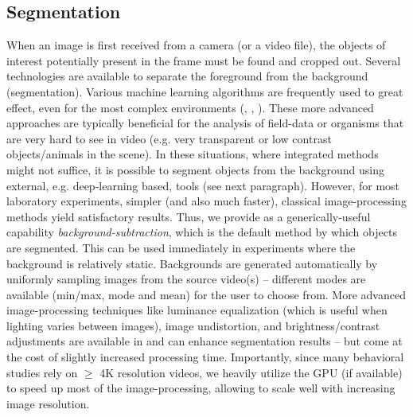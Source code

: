\documentclass[9pt,lineno]{elife}
\newcommand{\TRex}{\protect\path{TRex}}
\newcommand{\TGrabs}{\protect\path{TGrabs}}
\begin{document}
\subsection{Segmentation}

When an image is first received from a camera (or a video file), the objects of interest potentially present in the frame must be {\color{blue}found} and cropped out. Several technologies are available to separate the foreground from the background (segmentation). Various machine learning algorithms are frequently used to great effect, even for the most complex environments (\citealt{hughey2018challenges}, \citealt{robie2017machine}, \citealt{francisco2019low}). These more advanced approaches are typically beneficial for the analysis of field-data or organisms that are very hard to see in video (e.g. very transparent or low contrast objects/animals in the scene). {\color{blue} In these situations, where integrated methods might not suffice, it is possible to segment objects from the background using external, e.g. deep-learning based, tools (see next paragraph).} However, for most laboratory experiments, simpler (and also much faster), classical image-processing methods yield satisfactory results. {\color{blue} Thus, we provide as a generically-useful capability \emph{background-subtraction}, which is the default method by which objects are segmented. This can be used immediately in experiments where the background is relatively static. Backgrounds are generated automatically by uniformly sampling images from the source video(s) -- different modes are available (min/max, mode and mean) for the user to choose from. More advanced image-processing techniques like luminance equalization (which is useful when lighting varies between images), image undistortion, and brightness/contrast adjustments are available in \TGrabs{} and can enhance segmentation results -- but come at the cost of slightly increased processing time.} Importantly, since many behavioral studies rely on $\ge$ 4K resolution videos, we heavily utilize the GPU (if available) to speed up most of the image-processing, allowing \TRex{} to scale well with increasing image resolution.
\end{document}

